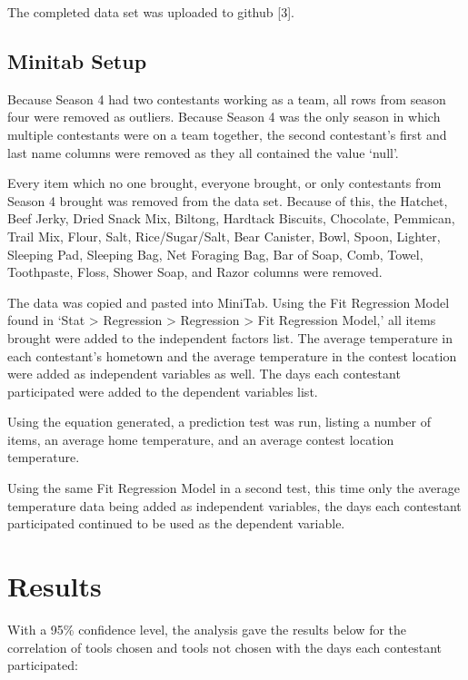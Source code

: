 \documentclass[letterpaper,twoside,11pt,twocolumn]{article}
\begin{document}
The completed data set was uploaded to github [3].
\subsection{Minitab Setup}
\noindent Because Season 4 had two contestants working as a team, all rows from season four were removed as outliers. Because Season 4 was the only season in which multiple contestants were on a team together, the second contestant's first and last name columns were removed as they all contained the value ‘null’. 

Every item which no one brought, everyone brought, or only contestants from Season 4 brought was removed from the data set. Because of this, the Hatchet, Beef Jerky, Dried Snack Mix, Biltong, Hardtack Biscuits, Chocolate, Pemmican, Trail Mix, Flour, Salt, Rice/Sugar/Salt, Bear Canister, Bowl, Spoon, Lighter, Sleeping Pad, Sleeping Bag, Net Foraging Bag, Bar of Soap, Comb, Towel, Toothpaste, Floss, Shower Soap, and Razor columns were removed. 

The data was copied and pasted into MiniTab. Using the Fit Regression Model found in ‘Stat > Regression > Regression > Fit Regression Model,’ all items brought were added to the independent factors list. The average temperature in each contestant’s hometown and the average temperature in the contest location were added as independent variables as well. The days each contestant participated were added to the dependent variables list.

Using the equation generated, a prediction test was run, listing a number of items, an average home temperature, and an average contest location temperature. 

Using the same Fit Regression Model in a second test, this time only the average temperature data being added as independent variables, the days each contestant participated continued to be used as the dependent variable.

\section{Results}
\noindent With a 95\% confidence level, the analysis gave the results below for the correlation of tools chosen and tools not chosen with the days each contestant participated:
\end{document}
